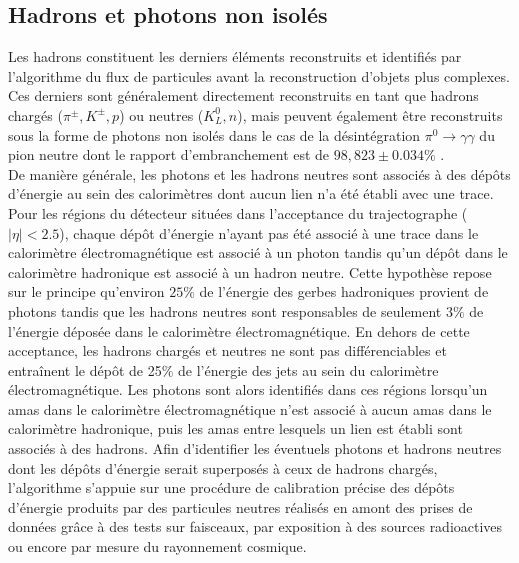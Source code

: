 \subsection{Hadrons et photons non isolés}
\label{HadID}

Les hadrons constituent les derniers éléments reconstruits et identifiés par l'algorithme du flux de particules avant la reconstruction d'objets plus complexes. Ces derniers sont généralement directement reconstruits en tant que hadrons chargés ($\pi^{\pm}, K^{\pm}, p$) ou neutres ($K^0_L, n$), mais peuvent également être reconstruits sous la forme de photons non isolés dans le cas de la désintégration $\pi^0\rightarrow\gamma\gamma$ du pion neutre dont le rapport d'embranchement est de $98,823\pm0.034\%$ \cite{PDG2022}. \\

De manière générale, les photons et les hadrons neutres sont associés à des dépôts d'énergie au sein des calorimètres dont aucun lien n'a été établi avec une trace. Pour les régions du détecteur situées dans l'acceptance du trajectographe ($|\eta|<2.5$), chaque dépôt d'énergie n'ayant pas été associé à une trace dans le calorimètre électromagnétique est associé à un photon tandis qu'un dépôt dans le calorimètre hadronique est associé à un hadron neutre. Cette hypothèse repose sur le principe qu'environ $25\%$ de l'énergie des gerbes hadroniques provient de photons tandis que les hadrons neutres sont responsables de seulement $3\%$ de l'énergie déposée dans le calorimètre électromagnétique. En dehors de cette acceptance, les hadrons chargés et neutres ne sont pas différenciables et entraînent le dépôt de 25$\%$ de l'énergie des jets au sein du calorimètre électromagnétique. Les photons sont alors identifiés dans ces régions lorsqu'un amas dans le calorimètre électromagnétique n'est associé à aucun amas dans le calorimètre hadronique, puis les amas entre lesquels un lien est établi sont associés à des hadrons. Afin d'identifier les éventuels photons et hadrons neutres dont les dépôts d'énergie serait superposés à ceux de hadrons chargés, l'algorithme s'appuie sur une procédure de calibration précise des dépôts d'énergie produits par des particules neutres réalisés en amont des prises de données grâce à des tests sur faisceaux, par exposition à des sources radioactives ou encore par mesure du rayonnement cosmique. \\

